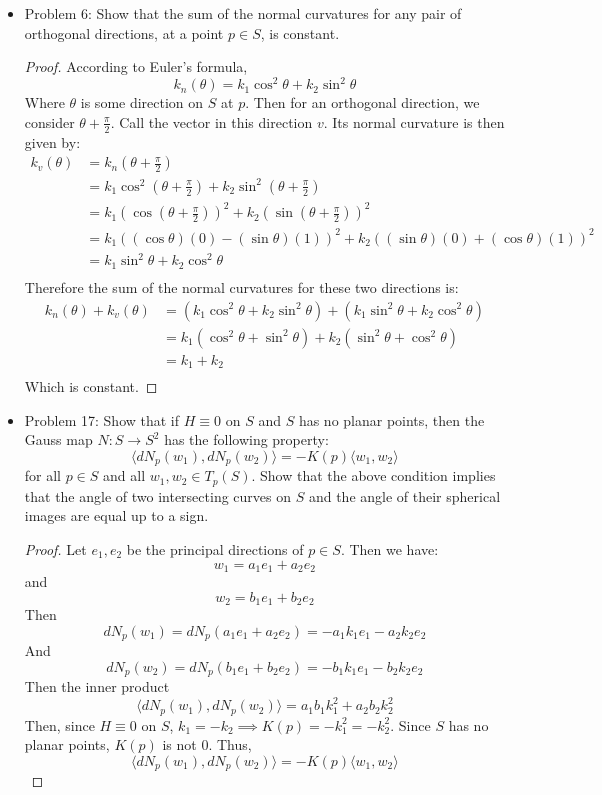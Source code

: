 \documentclass[a4paper,17pt]{extarticle}
\theoremstyle{definition}
\begin{document}
\begin{itemize}
\begin{proof}
    \end{proof}
    \item Problem 6: Show that the sum of the normal curvatures for any pair of orthogonal directions, at a point $p\in S$, is constant.\begin{proof} According to Euler's formula, $$k_n(\theta)=k_1\cos^2\theta+k_2\sin^2\theta$$ Where $\theta$ is some direction on $S$ at $p$. Then for an orthogonal direction, we consider $\theta+\frac{\pi}{2}$. Call the vector in this direction $v$. Its normal curvature is then given by:\begin{align*}
        k_v(\theta)&=k_n\left(\theta+\frac{\pi}{2}\right)\\
        &=k_1\cos^2\left(\theta+\frac{\pi}{2}\right)+k_2\sin^2\left(\theta+\frac{\pi}{2}\right)\\
        &=k_1\left(\cos\left(\theta+\frac{\pi}{2}\right)\right)^2+k_2\left(\sin\left(\theta+\frac{\pi}{2}\right)\right)^2\\
        &=k_1((\cos\theta)(0)-(\sin\theta)(1))^2+k_2((\sin\theta)(0)+(\cos\theta)(1))^2\\
        &=k_1\sin^2\theta+k_2\cos^2\theta\\
    \end{align*}
    Therefore the sum of the normal curvatures for these two directions is:\begin{align*}
        k_n(\theta)+k_v(\theta)&=(k_1\cos^2\theta+k_2\sin^2\theta)+(k_1\sin^2\theta+k_2\cos^2\theta)\\
        &=k_1(\cos^2\theta+\sin^2\theta)+k_2(\sin^2\theta+\cos^2\theta)\\
        &=k_1+k_2\\
    \end{align*}
    Which is constant.
    \end{proof}
    \item Problem 17: Show that if $H\equiv0$ on $S$ and $S$ has no planar points, then the Gauss map $N:S\to S^2$ has the following property: $$\langle dN_p(w_1),dN_p(w_2)\rangle=-K(p)\langle w_1,w_2\rangle$$ for all $p\in S$ and all $w_1,w_2\in T_p(S)$. Show that the above condition implies that the angle of two intersecting curves on $S$ and the angle of their spherical images are equal up to a sign.\begin{proof}
    Let $e_1,e_2$ be the principal directions of $p\in S$. Then we have: $$w_1=a_1e_1+a_2e_2$$ and $$w_2=b_1e_1+b_2e_2$$ Then $$dN_p(w_1)=dN_p(a_1e_1+a_2e_2)=-a_1k_1e_1-a_2k_2e_2$$ And $$dN_p(w_2)=dN_p(b_1e_1+b_2e_2)=-b_1k_1e_1-b_2k_2e_2$$ Then the inner product $$\langle dN_p(w_1),dN_p(w_2)\rangle=a_1b_1k_1^2+a_2b_2k_2^2$$
    Then, since $H\equiv0$ on $S$, $k_1=-k_2\implies K(p)=-k_1^2=-k_2^2$. Since $S$ has no planar points, $K(p)$ is not 0. Thus, $$\langle dN_p(w_1),dN_p(w_2)\rangle=-K(p)\langle w_1,w_2\rangle$$
    \end{proof}
\end{itemize}
\end{document}

